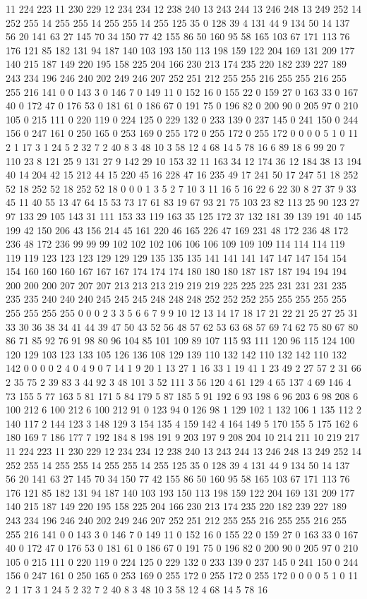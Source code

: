 11 224 223 11 230 229 12 234 234 12 238 240 13 243 244 13 246 248 13 249 252 14 252 255 14 255 255 14 255 255 14 255 125 35 0 128 39 4 131 44 9 134 50 14 137 56 20 141 63 27 145 70 34 150 77 42 155 86 50 160 95 58 165 103 67 171 113 76 176 121 85 182 131 94 187 140 103 193 150 113 198 159 122 204 169 131 209 177 140 215 187 149 220 195 158 225 204 166 230 213 174 235 220 182 239 227 189 243 234 196 246 240 202 249 246 207 252 251 212 255 255 216 255 255 216 255 255 216 141 0 0 143 3 0 146 7 0 149 11 0 152 16 0 155 22 0 159 27 0 163 33 0 167 40 0 172 47 0 176 53 0 181 61 0 186 67 0 191 75 0 196 82 0 200 90 0 205 97 0 210 105 0 215 111 0 220 119 0 224 125 0 229 132 0 233 139 0 237 145 0 241 150 0 244 156 0 247 161 0 250 165 0 253 169 0 255 172 0 255 172 0 255 172 0 0 0 0 5 1 0 11 2 1 17 3 1 24 5 2 32 7 2 40 8 3 48 10 3 58 12 4 68 14 5 78 16 
6 89 18 6 99 20 7 110 23 8 121 25 9 131 27 9 142 29 10 153 32 11 163 34 12 174 36 12 184 38 13 194 40 14 204 42 15 212 44 15 220 45 16 228 47 16 235 49 17 241 50 17 247 51 18 252 52 18 252 52 18 252 52 18 0 0 0 1 3 5 2 7 10 3 11 16 5 16 22 6 22 30 8 27 37 9 33 45 11 40 55 13 47 64 15 53 73 17 61 83 19 67 93 21 75 103 23 82 113 25 90 123 27 97 133 29 105 143 31 111 153 33 119 163 35 125 172 37 132 181 39 139 191 40 145 199 42 150 206 43 156 214 45 161 220 46 165 226 47 169 231 48 172 236 48 172 236 48 172 236 99 99 99 102 102 102 106 106 106 109 109 109 114 114 114 119 119 119 123 123 123 129 129 129 135 135 135 141 141 141 147 147 147 154 154 154 160 160 160 167 167 167 174 174 174 180 180 180 187 187 187 194 194 194 200 200 200 207 207 207 213 213 213 219 219 219 225 225 225 231 231 231 235 235 235 240 240 240 245 245 245 248 248 248 252 252 252 255 255 255 255 255 255 255 255 255 
0 0 0 2 3 3 5 6 6 7 9 9 10 12 13 14 17 18 17 21 22 21 25 27 25 31 33 30 36 38 34 41 44 39 47 50 43 52 56 48 57 62 53 63 68 57 69 74 62 75 80 67 80 86 71 85 92 76 91 98 80 96 104 85 101 109 89 107 115 93 111 120 96 115 124 100 120 129 103 123 133 105 126 136 108 129 139 110 132 142 110 132 142 110 132 142 0 0 0 0 2 4 0 4 9 0 7 14 1 9 20 1 13 27 1 16 33 1 19 41 1 23 49 2 27 57 2 31 66 2 35 75 2 39 83 3 44 92 3 48 101 3 52 111 3 56 120 4 61 129 4 65 137 4 69 146 4 73 155 5 77 163 5 81 171 5 84 179 5 87 185 5 91 192 6 93 198 6 96 203 6 98 208 6 100 212 6 100 212 6 100 212 91 0 123 94 0 126 98 1 129 102 1 132 106 1 135 112 2 140 117 2 144 123 3 148 129 3 154 135 4 159 142 4 164 149 5 170 155 5 175 162 6 180 169 7 186 177 7 192 184 8 198 191 9 203 197 9 208 204 10 214 211 10 219 217 
11 224 223 11 230 229 12 234 234 12 238 240 13 243 244 13 246 248 13 249 252 14 252 255 14 255 255 14 255 255 14 255 125 35 0 128 39 4 131 44 9 134 50 14 137 56 20 141 63 27 145 70 34 150 77 42 155 86 50 160 95 58 165 103 67 171 113 76 176 121 85 182 131 94 187 140 103 193 150 113 198 159 122 204 169 131 209 177 140 215 187 149 220 195 158 225 204 166 230 213 174 235 220 182 239 227 189 243 234 196 246 240 202 249 246 207 252 251 212 255 255 216 255 255 216 255 255 216 141 0 0 143 3 0 146 7 0 149 11 0 152 16 0 155 22 0 159 27 0 163 33 0 167 40 0 172 47 0 176 53 0 181 61 0 186 67 0 191 75 0 196 82 0 200 90 0 205 97 0 210 105 0 215 111 0 220 119 0 224 125 0 229 132 0 233 139 0 237 145 0 241 150 0 244 156 0 247 161 0 250 165 0 253 169 0 255 172 0 255 172 0 255 172 0 0 0 0 5 1 0 11 2 1 17 3 1 24 5 2 32 7 2 40 8 3 48 10 3 58 12 4 68 14 5 78 16 
